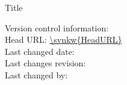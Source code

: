 \documentclass[12pt]{report}
\begin{document}
\begin{titlepage}
 \vspace{8ex}
 {\huge Title\par}
 \vfill
 \flushleft\sffamily
 Version control information:\\
 Head URL: \url{\svnkw{HeadURL}}\\
 Last changed date: \svndate\\
 Last changes revision: \svnrev\\
 Last changed by: \svnFullAuthor*{\svnauthor}\\
\end{titlepage}

\tableofcontents


%
%
\end{document}
